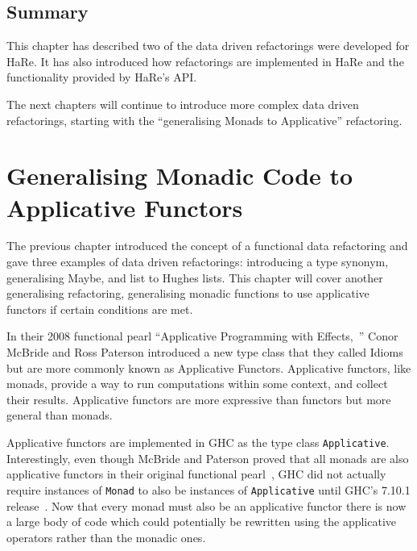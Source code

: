 \section{Summary}

This chapter has described two of the data driven refactorings were developed for HaRe. It has also introduced how refactorings are implemented in HaRe and the functionality provided by HaRe's API.

The next chapters will continue to introduce more complex data driven refactorings, starting with the ``generalising Monads to Applicative'' refactoring.



\chapter{Generalising Monadic Code to Applicative Functors}
\label{chp:applicative}

The previous chapter introduced the concept of a functional data refactoring and gave three examples of data driven refactorings: introducing a type synonym, generalising Maybe, and list to Hughes lists. This chapter will cover another generalising refactoring, generalising monadic functions to use applicative functors if certain conditions are met. 

In their 2008 functional pearl ``Applicative Programming with Effects,~\citep{mcbrideIdioms}'' Conor McBride and Ross Paterson introduced a new type class that they called Idioms but are more commonly known as Applicative Functors. Applicative functors, like monads, provide a way to run computations within some context, and collect their results. Applicative functors are more expressive than functors but more general than monads. 

Applicative functors are implemented in GHC as the type class \texttt{Applicative}. Interestingly, even though McBride and Paterson proved that all monads are also applicative functors in their original functional pearl~\citep{mcbrideIdioms}, GHC did not actually require instances of \texttt{Monad} to also be instances of \texttt{Applicative} until GHC's 7.10.1 release~\citep{ghc7.10Release}. Now that every monad must also be an applicative functor there is now a large body of code which could potentially be rewritten using the applicative operators rather than the monadic ones. 

